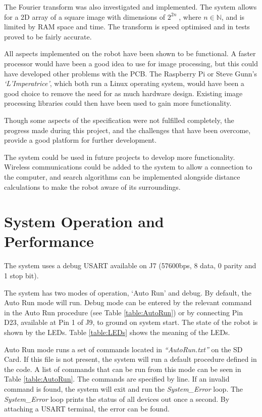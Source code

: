 The Fourier transform was also investigated and implemented. The system allows for a 2D array of a square image with dimensions of $2^{2n}\; $, where $n \in \mathbb{N}$, and is limited by RAM space and time. The transform is speed optimised and in tests proved to be fairly accurate. 

All aspects implemented on the robot have been shown to be functional. A faster processor would have been a good idea to use for image processing, but this could have developed other problems with the PCB. The Raspberry Pi or Steve Gunn's \textit{`L'Imperatrice'}, which both run a Linux operating system, would have been a good choice to remove the need for as much hardware design. Existing image processing libraries could then have been used to gain more functionality. 

Though some aspects of the specification were not fulfilled completely, the progress made during this project, and the challenges that have been overcome, provide a good platform for further development.

The system could be used in future projects to develop more functionality. Wireless communications could be added to the system to allow a connection to the computer, and search algorithms can be implemented alongside distance calculations to make the robot aware of its surroundings. 

\section{System Operation and Performance}

The system uses a debug USART available on J7 (57600bps, 8 data, 0 parity and 1 stop bit).

The system has two modes of operation, `Auto Run' and debug. By default, the Auto Run mode will run. Debug mode can be entered by the relevant command in the Auto Run procedure (see Table \ref{table:AutoRun}) or by connecting Pin D23, available at Pin 1 of J9, to ground on system start. The state of the robot is shown by the LEDs. Table \ref{table:LEDs} shows the meaning of the LEDs.

Auto Run mode runs a set of commands located in \textit{``AutoRun.txt''} on the SD Card. If this file is not present, the system will run a default procedure defined in the code. A list of commands that can be run from this mode can be seen in Table \ref{table:AutoRun}. The commands are specified by line. If an invalid command is found, the system will exit and run the \textit{System\_Error} loop. The  \textit{System\_Error} loop prints the status of all devices out once a second. By attaching a USART terminal, the error can be found.

